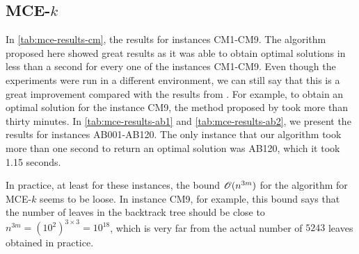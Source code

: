 \subsection{MCE-$k$}

In \autoref{tab:mce-results-cm}, the results for instances CM1-CM9. 
The algorithm proposed here showed great results as it was able to obtain optimal solutions in less than a second for every one of the instances CM1-CM9.
Even though the experiments were run in a different environment, we can still say that this is a great improvement compared with the results from . For example, to obtain an optimal solution for the instance CM9, the method proposed by  took more than thirty minutes.
In \autoref{tab:mce-results-ab1} and \autoref{tab:mce-results-ab2}, we present the results for instances AB001-AB120. The only instance that our algorithm took more than one second to return an optimal solution was AB120, which it took 1.15 seconds.

In practice, at least for these instances, the bound $\mathscr{O}(n^{3m})$ for the algorithm for MCE-$k$ seems to be loose. In instance CM9, for example, this bound says that the number of leaves in the backtrack tree should be close to $n^{3m} = (10^2)^{3\times 3} = 10^{18}$, which is very far from the actual number of $5243$ leaves obtained in practice.

\begin{table}\label{tab:mce-results-cm}
	\begin{center}
		\caption{Solutions of MCE-$k$ for instances CM1-CM9.}
	\end{center}
\end{table}

